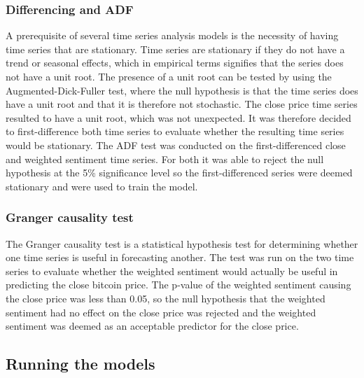 \documentclass{article}
\begin{document}
\subsubsection{Differencing and ADF}
A prerequisite of several time series analysis models is the necessity of having time series that are stationary. Time series are stationary if they do not have a trend or seasonal effects, which in empirical terms signifies that the series does not have a unit root. The presence of a unit root can be tested by using the Augmented-Dick-Fuller test, where the null hypothesis is that the time series does have a unit root and that it is therefore not stochastic.
The close price time series resulted to have a unit root, which was not unexpected. It was therefore decided to first-difference both time series to evaluate whether the resulting time series would be stationary. The ADF test was conducted on the first-differenced close and weighted sentiment time series. For both it was able to reject the null hypothesis at the 5\% significance level so the first-differenced series were deemed stationary and were used to train the model.
\subsubsection{Granger causality test}
The Granger causality test is a statistical hypothesis test for determining whether one time series is useful in forecasting another. The test was run on the two time series to evaluate whether the weighted sentiment would actually be useful in predicting the close bitcoin price. The p-value of the weighted sentiment causing the close price was less than 0.05, so the null hypothesis that the weighted sentiment had no effect on the close price was rejected and the weighted sentiment was deemed as an acceptable predictor for the close price.
\subsection{Running the models}
\end{document}
